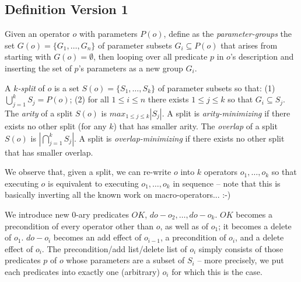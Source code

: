

\subsection{Definition Version 1}
\label{definition-v1}




Given an operator $o$ with parameters $P(o)$, define as the
\emph{parameter-groups} the set $G(o) = \{G_1, \dots, G_n\}$ of
parameter subsets $G_i \subseteq P(o)$ that arises from starting with
$G(o) = \emptyset$, then looping over all predicate $p$ in $o$'s
description and inserting the set of $p$'s parameters as a new group
$G_i$.


A \emph{$k$-split} of $o$ is a set $S(o) = \{S_1, \dots, S_k\}$ of
parameter subsets so that: (1) $\bigcup_{j=1}^k S_j = P(o)$; (2) for
all $1 \leq i \leq n$ there exists $1 \leq j \leq k$ so that $G_i
\subseteq S_j$. The \emph{arity} of a split $S(o)$ is $max_{1\leq j
  \leq k} |S_j|$. A split is \emph{arity-minimizing} if there exists
no other split (for any $k$) that has smaller arity. The
\emph{overlap} of a split $S(o)$ is $|\bigcap_{j=1}^k S_j|$. A split
is \emph{overlap-minimizing} if there exists no other split that has
smaller overlap.


We observe that, given a split, we can re-write $o$ into $k$ operators
$o_1, \dots, o_k$ so that executing $o$ is equivalent to executing
$o_1, \dots, o_k$ in sequence -- note that this is basically inverting
all the known work on macro-operators... :-)


We introduce new $0$-ary predicates $OK$, $do-o_2, \dots,
do-o_k$. $OK$ becomes a precondition of every operator other than $o$,
as well as of $o_1$; it becomes a delete of $o_1$. $do-o_i$ becomes an
add effect of $o_{i-1}$, a precondition of $o_i$, and a delete effect
of $o_i$. The precondition/add list/delete list of $o_i$ simply
consists of those predicates $p$ of $o$ whose parameters are a subset
of $S_i$ -- more precisely, we put each predicates into exactly one
(arbitrary) $o_i$ for which this is the case. 



